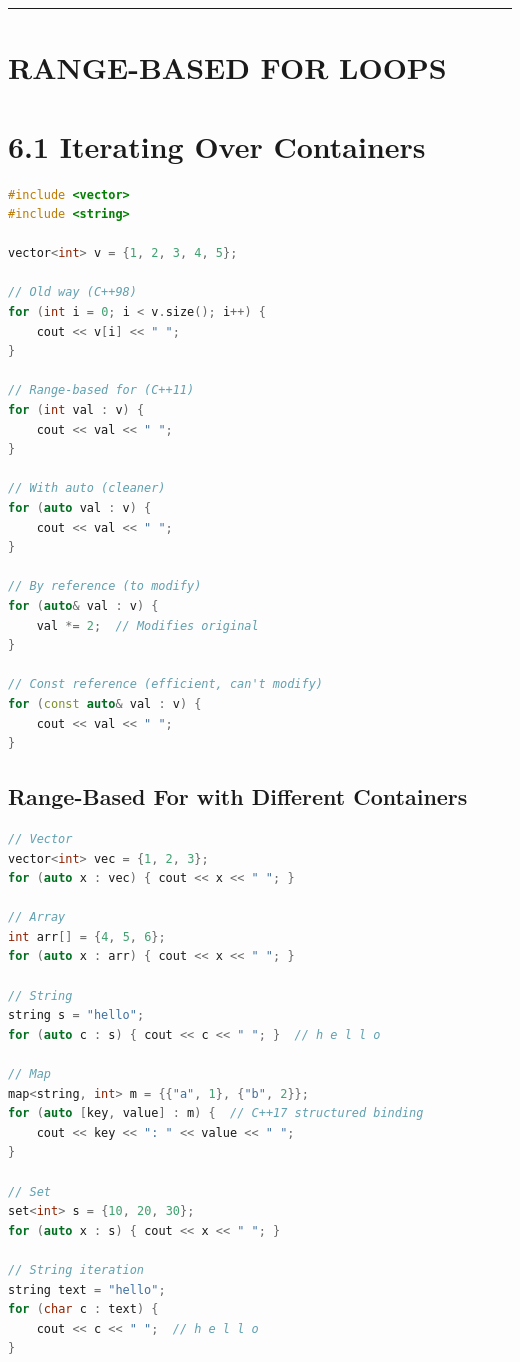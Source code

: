 \begin{center}\rule{0.5\linewidth}{0.5pt}\end{center}

\hypertarget{range-based-for-loops}{%
\section{RANGE-BASED FOR LOOPS}\label{range-based-for-loops}}

\hypertarget{iterating-over-containers}{%
\section{6.1 Iterating Over
Containers}\label{iterating-over-containers}}

\begin{lstlisting}[language={C++}]
#include <vector>
#include <string>

vector<int> v = {1, 2, 3, 4, 5};

// Old way (C++98)
for (int i = 0; i < v.size(); i++) {
    cout << v[i] << " ";
}

// Range-based for (C++11)
for (int val : v) {
    cout << val << " ";
}

// With auto (cleaner)
for (auto val : v) {
    cout << val << " ";
}

// By reference (to modify)
for (auto& val : v) {
    val *= 2;  // Modifies original
}

// Const reference (efficient, can't modify)
for (const auto& val : v) {
    cout << val << " ";
}
\end{lstlisting}

\hypertarget{range-based-for-with-different-containers}{%
\subsection{Range-Based For with Different
Containers}\label{range-based-for-with-different-containers}}

\begin{lstlisting}[language={C++}]
// Vector
vector<int> vec = {1, 2, 3};
for (auto x : vec) { cout << x << " "; }

// Array
int arr[] = {4, 5, 6};
for (auto x : arr) { cout << x << " "; }

// String
string s = "hello";
for (auto c : s) { cout << c << " "; }  // h e l l o

// Map
map<string, int> m = {{"a", 1}, {"b", 2}};
for (auto [key, value] : m) {  // C++17 structured binding
    cout << key << ": " << value << " ";
}

// Set
set<int> s = {10, 20, 30};
for (auto x : s) { cout << x << " "; }

// String iteration
string text = "hello";
for (char c : text) {
    cout << c << " ";  // h e l l o
}
\end{lstlisting}

